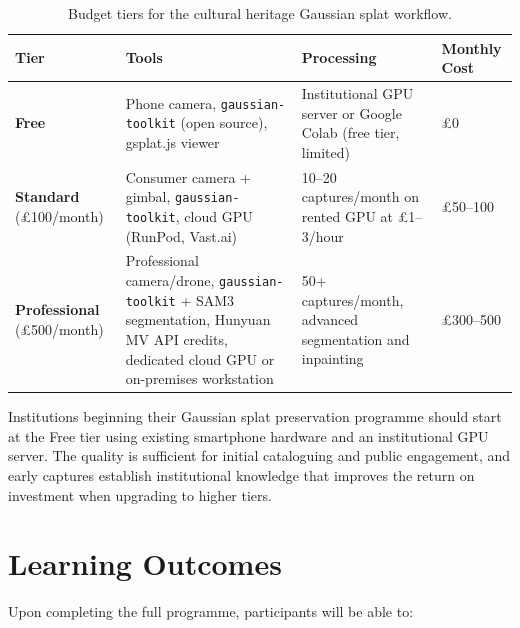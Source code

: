 \begin{table}[htbp]
  \centering
  \caption{Budget tiers for the cultural heritage Gaussian splat workflow.}
  \label{tab:budget-tiers}
  \begin{tabular}{@{}L{2.2cm}L{4cm}L{4cm}L{3cm}@{}}
    \toprule
    \textbf{Tier} & \textbf{Tools} & \textbf{Processing} & \textbf{Monthly Cost} \\
    \midrule
    \textbf{Free}
      & Phone camera, \texttt{gaussian-toolkit} (open source), gsplat.js viewer
      & Institutional GPU server or Google Colab (free tier, limited)
      & \pounds 0 \\
    \addlinespace
    \textbf{Standard} (\pounds 100/month)
      & Consumer camera + gimbal, \texttt{gaussian-toolkit}, cloud GPU (RunPod, Vast.ai)
      & 10--20 captures/month on rented GPU at \pounds 1--3/hour
      & \pounds 50--100 \\
    \addlinespace
    \textbf{Professional} (\pounds 500/month)
      & Professional camera/drone, \texttt{gaussian-toolkit} + SAM3 segmentation, Hunyuan MV API credits, dedicated cloud GPU or on-premises workstation
      & 50+ captures/month, advanced segmentation and inpainting
      & \pounds 300--500 \\
    \bottomrule
  \end{tabular}
\end{table}

\begin{recommendation}
Institutions beginning their Gaussian splat preservation programme should start at the Free tier using existing smartphone hardware and an institutional GPU server. The quality is sufficient for initial cataloguing and public engagement, and early captures establish institutional knowledge that improves the return on investment when upgrading to higher tiers.
\end{recommendation}

\section{Learning Outcomes}
\label{sec:train-outcomes}

Upon completing the full programme, participants will be able to:

